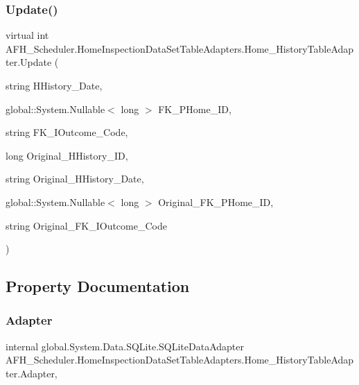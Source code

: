 \subsubsection{Update()\hspace{0.1cm}{\footnotesize\ttfamily [6/6]}}
{\footnotesize\ttfamily virtual int A\+F\+H\+\_\+\+Scheduler.\+Home\+Inspection\+Data\+Set\+Table\+Adapters.\+Home\+\_\+\+History\+Table\+Adapter.\+Update (\begin{DoxyParamCaption}\item[{string}]{H\+History\+\_\+\+Date,  }\item[{global\+::\+System.\+Nullable$<$ long $>$}]{F\+K\+\_\+\+P\+Home\+\_\+\+ID,  }\item[{string}]{F\+K\+\_\+\+I\+Outcome\+\_\+\+Code,  }\item[{long}]{Original\+\_\+\+H\+History\+\_\+\+ID,  }\item[{string}]{Original\+\_\+\+H\+History\+\_\+\+Date,  }\item[{global\+::\+System.\+Nullable$<$ long $>$}]{Original\+\_\+\+F\+K\+\_\+\+P\+Home\+\_\+\+ID,  }\item[{string}]{Original\+\_\+\+F\+K\+\_\+\+I\+Outcome\+\_\+\+Code }\end{DoxyParamCaption})\hspace{0.3cm}{\ttfamily [virtual]}}



\subsection{Property Documentation}
\mbox{\label{class_a_f_h___scheduler_1_1_home_inspection_data_set_table_adapters_1_1_home___history_table_adapter_a1afbfe49585941731cb150ecba42cb45}} 
\subsubsection{Adapter}
{\footnotesize\ttfamily internal global.\+System.\+Data.\+S\+Q\+Lite.\+S\+Q\+Lite\+Data\+Adapter A\+F\+H\+\_\+\+Scheduler.\+Home\+Inspection\+Data\+Set\+Table\+Adapters.\+Home\+\_\+\+History\+Table\+Adapter.\+Adapter\hspace{0.3cm}{\ttfamily [get]}, {\ttfamily [protected]}}

